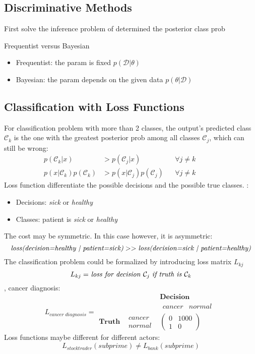 \subsection{Discriminative Methods}
First solve the inference problem of determined the posterior class \ac{prob}

\note Frequentist versus Bayesian
\begin{itemize}
	\item Frequentist: the \ac{param} is fixed $p(\mathcal{D} | \theta)$
	\item Bayesian: the \ac{param} depends on the given data $p(\theta | \mathcal{D})$
\end{itemize}

\subsection{Classification with Loss Functions}
For classification problem with more than 2 classes, the output's predicted class $\mathcal{C}_k$ is the one with the greatest posterior \ac{prob} among all classes $\mathcal{C}_j$, which can still be wrong:
\begin{align*}
	p(\mathcal{C}_k|x) &> p(\mathcal{C}_j|x) && \forall j \neq k && && \\
	p(x|\mathcal{C}_k)p(\mathcal{C}_k) &> p(x|\mathcal{C}_j)p(\mathcal{C}_j) && \forall j \neq k && &&
\end{align*}
Loss function differentiate the possible decisions and the possible true classes. \Eg:
\begin{itemize}
	\item Decisions: \textit{sick} or \textit{healthy}
	\item Classes: patient is \textit{sick} or \textit{healthy}
\end{itemize}
The cost may be symmetric. In this case however, it is asymmetric:
\[\text{\textit{loss(decision=healthy | patient=sick)}} >> \text{\textit{loss(decision=sick | patient=healthy)}} \]
The classification problem could be formalized by introducing loss matrix $L_{kj}$
\[ L_{kj} =$ \textit{loss for decision} $\mathcal{C}_j$ \textit{if truth is} $\mathcal{C}_k \]
\Eg, cancer diagnosis:
\[L_{cancer\;diagnosis} = \begin{matrix}
	  & & \textbf{Decision}\\
	  & & \begin{matrix}
	  		cancer & normal
	  \end{matrix}\\
  	\textbf{Truth} & \begin{matrix}
  		cancer \\ normal
  	\end{matrix} & \begin{pmatrix}
		0 & 1000\\
		1 & 0
	\end{pmatrix}
\end{matrix}\]
Loss functions maybe different for different actors:
\[ L_{stocktrader}(subprime) \neq L_{bank}(subprime)\]

